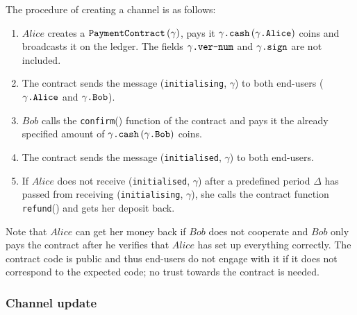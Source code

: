   The procedure of creating a channel is as follows:
  \begin{enumerate}
    \item $Alice$ creates a $\mbox{\texttt{PaymentContract}}\left(\gamma\right)$, pays it
    $\gamma\mbox{\texttt{.cash}}\left(\gamma\mbox{\texttt{.Alice}}\right)$ coins and
    broadcasts it on the ledger. The fields $\gamma\mbox{\texttt{.ver-num}}$ and
    $\gamma\mbox{\texttt{.sign}}$ are not included.
    \item The contract sends the message (\texttt{initialising}, $\gamma$) to both
    end-users ($\gamma\mbox{\texttt{.Alice}}$ and $\gamma\mbox{\texttt{.Bob}}$).
    \item $Bob$ calls the \texttt{confirm}() function of the contract and pays it the
    already specified amount of
    $\gamma\mbox{\texttt{.cash}}\left(\gamma\mbox{\texttt{.Bob}}\right)$ coins.
    \item The contract sends the message (\texttt{initialised}, $\gamma$) to both
    end-users.
    \item If $Alice$ does not receive (\texttt{initialised}, $\gamma$) after a predefined
    period $\Delta$ has passed from receiving (\texttt{initialising}, $\gamma$), she calls
    the contract function \texttt{refund}() and gets her deposit back.
  \end{enumerate}

  Note that $Alice$ can get her money back if $Bob$ does not cooperate and $Bob$ only pays
  the contract after he verifies that $Alice$ has set up everything correctly. The
  contract code is public and thus end-users do not engage with it if it does not
  correspond to the expected code; no trust towards the contract is needed.

  \subsubsection{Channel update} \ \\

